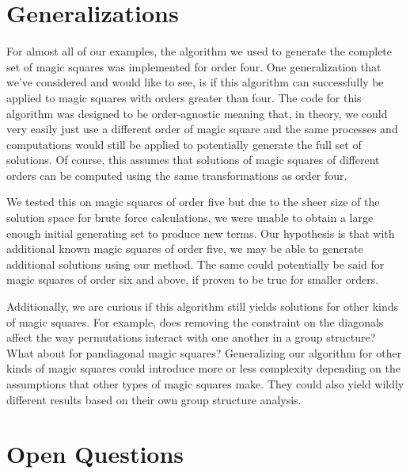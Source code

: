 \documentclass[12pt]{report}
\begin{document}
\section{Generalizations}

\par For almost all of our examples, the algorithm we used to generate the complete set of magic
squares was implemented for order four. One generalization that we've considered and would like to
see, is if this algorithm can successfully be applied to magic squares with orders greater than
four. The code for this algorithm was designed to be order-agnostic meaning that, in theory, we
could very easily just use a different order of magic square and the same processes and
computations would still be applied to potentially generate the full set of solutions. Of course,
this assumes that solutions of magic squares of different orders can be computed using the same
transformations as order four.

\par We tested this on magic squares of order five but due to the sheer size of the solution space
for brute force calculations, we were unable to obtain a large enough initial generating set to
produce new terms. Our hypothesis is that with additional known magic squares of order five, we may
be able to generate additional solutions using our method. The same could potentially be said for
magic squares of order six and above, if proven to be true for smaller orders.

\par Additionally, we are curious if this algorithm still yields solutions for other kinds of magic
squares. For example, does removing the constraint on the diagonals affect the way permutations
interact with one another in a group structure? What about for pandiagonal magic squares?
Generalizing our algorithm for other kinds of magic squares could introduce more or less complexity
depending on the assumptions that other types of magic squares make. They could also yield wildly
different results based on their own group structure analysis.

\section{Open Questions}
\end{document}

